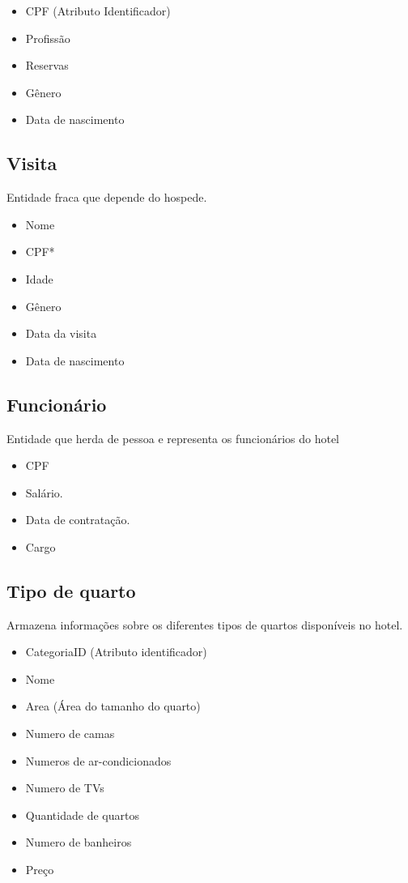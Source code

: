 \begin{itemize}
    \item CPF (Atributo Identificador)
    \item Profissão
    \item Reservas
    \item Gênero
    \item Data de nascimento
\end{itemize}

\subsection{Visita}

Entidade fraca que depende do hospede.

\begin{itemize}
    \item Nome
    \item CPF*
    \item Idade
    \item Gênero
    \item Data da visita
    \item Data de nascimento
\end{itemize}

\subsection{Funcionário}

Entidade que herda de pessoa e representa os funcionários do hotel

\begin{itemize}
    \item CPF
    \item Salário.
    \item Data de contratação.
    \item Cargo
\end{itemize}

\subsection{Tipo de quarto}

Armazena informações sobre os diferentes tipos de quartos disponíveis no hotel.

\begin{itemize}
    \item CategoriaID (Atributo identificador)
    \item Nome
    \item Area (Área do tamanho do quarto)
    \item Numero de camas
    \item Numeros de ar-condicionados
    \item Numero de TVs
    \item Quantidade de quartos
    \item Numero de banheiros
    \item Preço
\end{itemize}


